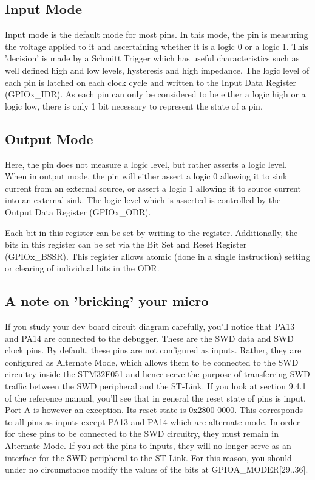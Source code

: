 \subsection{Input Mode}
Input mode is the default mode for most pins. In this mode, the pin is measuring the voltage applied to it and ascertaining whether it is a logic 0 or a logic 1. This 'decision' is made by a Schmitt Trigger which has useful characteristics such as well defined high and low levels, hysteresis and high impedance. The logic level of each pin is latched on each clock cycle and written to the Input Data Register (GPIOx\_IDR). As each pin can only be considered to be either a logic high or a logic low, there is only 1 bit necessary to represent the state of a pin.

\subsection{Output Mode}
Here, the pin does not measure a logic level, but rather asserts a logic level. When in output mode, the pin will either assert a logic 0 allowing it to sink current from an external source, or assert a logic 1 allowing it to source current into an external sink. The logic level which is asserted is controlled by the Output Data Register (GPIOx\_ODR). 

Each bit in this register can be set by writing to the register. Additionally, the bits in this register can be set via the Bit Set and Reset Register (GPIOx\_BSSR). This register allows atomic (done in a single instruction) setting or clearing of individual bits in the ODR. 

\subsection{A note on 'bricking' your micro}
If you study your dev board circuit diagram carefully, you'll notice that PA13 and PA14 are connected to the debugger. These are the SWD data and SWD clock pins. By default, these pins are not configured as inputs. Rather, they are configured as Alternate Mode, which allows them to be connected to the SWD circuitry inside the STM32F051 and hence serve the purpose of transferring SWD traffic between the SWD peripheral and the ST-Link. If you look at section 9.4.1 of the reference manual, you'll see that in general the reset state of pins is input. Port A is however an exception. Its reset state is 0x2800 0000. This corresponds to all pins as inputs except PA13 and PA14 which are alternate mode. In order for these pins to be connected to the SWD circuitry, they must remain in Alternate Mode. If you set the pins to inputs, they will no longer serve as an interface for the SWD peripheral to the ST-Link. For this reason, you should under no circumstance modify the values of the bits at GPIOA\_MODER[29..36]. 

